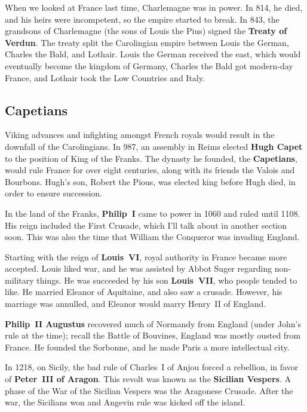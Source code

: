 When we looked at France last time, Charlemagne was in power.
In 814, he died, and his heirs were incompetent, so the empire started to break.
In 843, the grandsons of Charlemagne (the sons of Louis the Pius) signed the \textbf{Treaty of Verdun}.
The treaty split the Carolingian empire between Louis the German, Charles the Bald, and Lothair.
Louis the German received the east, which would eventually become the kingdom of Germany,
Charles the Bald got modern-day France,
and Lothair took the Low Countries and Italy.

\subsection*{Capetians}

Viking advances and infighting amongst French royals would result in the downfall of the Carolingians.
In 987, an assembly in Reims elected \textbf{Hugh Capet} to the position of King of the Franks.
The dynasty he founded, the \textbf{Capetians}, would rule France for over eight centuries,
along with its friends the Valois and Bourbons.
Hugh's son, Robert the Pious, was elected king before Hugh died, in order to ensure succession.

In the land of the Franks, \textbf{Philip~I} came to power in 1060 and ruled until 1108.
His reign included the First Crusade, which I'll talk about in another section soon.
This was also the time that William the Conqueror was invading England.

Starting with the reign of \textbf{Louis~VI}, royal authority in France became more accepted.
Louis liked war, and he was assisted by Abbot Suger regarding non-military things.
He was succeeded by his son \textbf{Louis~VII}, who people tended to like.
He married Eleanor of Aquitaine, and also saw a crusade.
However, his marriage was annulled, and Eleanor would marry Henry~II of England.

\textbf{Philip~II Augustus} recovered much of Normandy from England (under John's rule at the time);
recall the Battle of Bouvines, England was mostly ousted from France.
He founded the Sorbonne, and he made Paris a more intellectual city.

In 1218, on Sicily, the bad rule of Charles~I of Anjou forced a rebellion,
in favor of \textbf{Peter~III of Aragon}.
This revolt was known as the \textbf{Sicilian Vespers}.
A phase of the War of the Sicilian Vespers was the Aragonese Crusade.
After the war, the Sicilians won and Angevin rule was kicked off the island.

